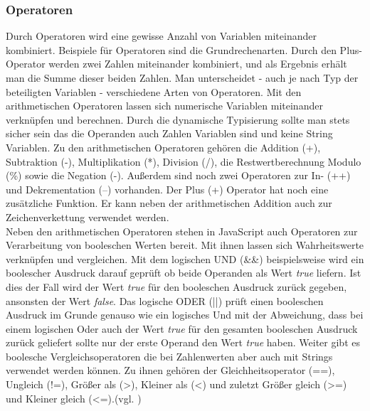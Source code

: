 \subsubsection{Operatoren} \glqq Durch Operatoren wird eine gewisse Anzahl von Variablen miteinander kombiniert. Beispiele für Operatoren sind die Grundrechenarten. Durch den Plus-Operator werden zwei Zahlen miteinander kombiniert, und als Ergebnis erhält man die Summe dieser beiden Zahlen. Man unterscheidet - auch je nach Typ der beteiligten Variablen - verschiedene Arten von Operatoren.\grqq{}\cite[S.69]{WenzJava2008} Mit den arithmetischen Operatoren lassen sich numerische Variablen miteinander verknüpfen und berechnen. Durch die dynamische Typisierung sollte man stets sicher sein das die Operanden auch Zahlen Variablen sind und keine String Variablen. Zu den arithmetischen Operatoren gehören die Addition (+), Subtraktion (-), Multiplikation (*), Division (/), die Restwertberechnung Modulo (\%) sowie die Negation (-). Außerdem sind noch zwei Operatoren zur In- (++) und Dekrementation (--) vorhanden. Der Plus (+) Operator hat noch eine zusätzliche Funktion. Er kann neben der arithmetischen Addition auch zur Zeichenverkettung verwendet werden.\\Neben den arithmetischen Operatoren stehen in JavaScript auch Operatoren zur Verarbeitung von booleschen Werten bereit. Mit ihnen lassen sich Wahrheitswerte verknüpfen und vergleichen. Mit dem logischen UND (\&\&) beispielsweise wird ein boolescher Ausdruck darauf geprüft ob beide Operanden als Wert \textit{true} liefern. Ist dies der Fall wird der Wert \textit{true} für den booleschen Ausdruck zurück gegeben, ansonsten der Wert \textit{false}. Das logische ODER (||) prüft einen booleschen Ausdruck im Grunde genauso wie ein logisches Und mit der Abweichung, dass bei einem logischen Oder auch der Wert \textit{true} für den gesamten booleschen Ausdruck zurück geliefert sollte nur der erste Operand den Wert \textit{true} haben. Weiter gibt es boolesche Vergleichsoperatoren die bei Zahlenwerten aber auch mit Strings verwendet werden können. Zu ihnen gehören der Gleichheitsoperator (==), Ungleich (!=), Größer als (\textgreater), Kleiner als (\textless) und zuletzt Größer gleich (\textgreater=) und Kleiner gleich (\textless=).(vgl. \cite[S.71ff]{WenzJava2008})

